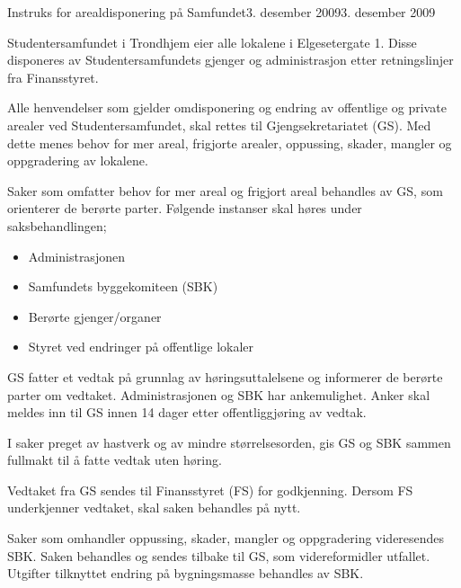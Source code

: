 \begin{instruks}{Instruks for arealdisponering på Samfundet}{3. desember 2009}{3. desember 2009}

    Studentersamfundet i Trondhjem eier alle lokalene i Elgesetergate 1. Disse disponeres
    av Studentersamfundets gjenger og administrasjon etter retningslinjer fra Finansstyret.

    Alle henvendelser som gjelder omdisponering og endring av offentlige og private
    arealer ved Studentersamfundet,
    skal rettes til Gjengsekretariatet (GS). Med dette menes behov for mer areal,
    frigjorte arealer, oppussing, skader,
    mangler og oppgradering av lokalene.

    Saker som omfatter behov for mer areal og frigjort areal behandles av GS, som
    orienterer de berørte parter. Følgende
    instanser skal høres under saksbehandlingen;

    \begin{itemize}
        \item Administrasjonen
        \item Samfundets byggekomiteen (SBK)
        \item Berørte gjenger/organer
        \item Styret ved endringer på offentlige lokaler
    \end{itemize}

    GS fatter et vedtak på grunnlag av høringsuttalelsene og informerer de berørte parter
    om vedtaket. Administrasjonen
    og SBK har ankemulighet. Anker skal meldes inn til GS innen 14 dager etter
    offentliggjøring av vedtak.

    I saker preget av hastverk og av mindre størrelsesorden, gis GS og SBK sammen fullmakt
    til å fatte vedtak uten
    høring.

    Vedtaket fra GS sendes til Finansstyret (FS) for godkjenning. Dersom FS underkjenner
    vedtaket, skal saken behandles
    på nytt.

    Saker som omhandler oppussing, skader, mangler og oppgradering videresendes SBK. Saken
    behandles og sendes
    tilbake til GS, som videreformidler utfallet. Utgifter tilknyttet endring på
    bygningsmasse behandles av SBK.

\end{instruks}

